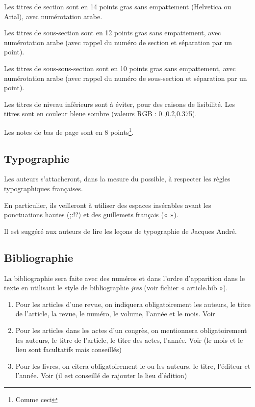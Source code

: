 \documentclass[city=Montpellier,year=2013]{jres}
\begin{document}
Les titres de section sont en 14 points gras sans empattement
(Helvetica ou Arial), avec numérotation arabe.

Les titres de sous-section sont en 12 points gras sans empattement,
avec numérotation arabe (avec rappel du numéro de section et
séparation par un point).

Les titres de sous-sous-section sont en 10 points gras sans empattement,
avec numérotation arabe (avec rappel du numéro de sous-section et
séparation par un point).

Les titres de niveau inférieurs sont à éviter, pour des raisons de
lisibilité.
Les titres sont en couleur bleue sombre (valeurs RGB : 0.,0.2,0.375).  

Les notes de bas de page sont en 8 points\footnote{Comme ceci}.

\subsection{Typographie}

Les auteurs s'attacheront, dans la mesure du possible, à respecter les
règles typographiques françaises.

En particulier, ils veilleront à utiliser des espaces insécables avant
les ponctuations hautes (;:!?) et des guillemets français (« »).

Il est suggéré aux auteurs de lire les leçons de
typographie \cite{andre1990} de Jacques André.

\subsection{Bibliographie}

La bibliographie sera faite avec des numéros et dans l'ordre
d'apparition dans le texte en utilisant le style de bibliographie
\emph{jres} (voir fichier « article.bib »).

\begin{enumerate}

    \item Pour les articles d'une revue, on indiquera obligatoirement les
      auteurs, le titre de l'article, la revue, le numéro, le volume,
      l'année et le mois. Voir \cite{exemple1}

    \item Pour les articles dans les actes d'un congrès, on mentionnera
      obligatoirement les auteurs, le titre de l'article, le titre des
      actes, l'année. Voir \cite{exemple2} (le mois et le lieu sont
      facultatifs mais conseillés)

    \item Pour les livres, on citera obligatoirement le ou les auteurs, le
      titre, l'éditeur et l'année. Voir \cite{exemple3} (il est conseillé de
      rajouter le lieu d'édition)

\end{enumerate}
\end{document}
